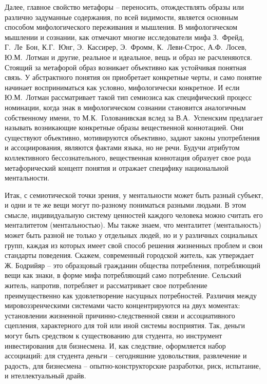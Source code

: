 Далее, главное свойство метафоры -- переносить, отождествлять образы или различно
задуманные содержания, по всей видимости, является основным способом мифологического
переживания и мышления. В мифологическом мышлении и сознании, как отмечают многие
исследователи мифа З.~Фрейд, Г.~Ле~Бон, К.Г.~Юнг, Э.~Кассирер, Э.~Фромм, К.~Леви-Строс,
А.Ф.~Лосев, Ю.М.~Лотман и другие, реальное и идеальное, вещь и образ не расчленяются.
Стоящий за метафорой образ возникает объективно как устойчивая понятная связь. У абстрактного
понятия он приобретает конкретные черты, и само понятие начинает восприниматься как условно,
мифологически конкретное. И если Ю.М.~Лотман рассматривает такой тип семиозиса как специфический
процесс номинации, когда знак в мифологическом сознании становится аналогичным собственному имени\autocite{name_culture},
то М.К.~Голованивская вслед за В.А.~Успенским предлагает называть возникающие конкретные образы
вещественной коннотацией\autocite{uspensky}. Они существуют объективно, мотивируются объективно,
задают законы употребления и ассоциирования, являются фактами языка, но не речи. Будучи атрибутом
коллективного бессознательного, вещественная коннотация образует свое рода метафорический концепт
понятия и отражает специфику национальной ментальности.

Итак, с семиотической точки зрения, у ментальности может быть разный субъект,
и одни и те же вещи могут по-разному пониматься разными людьми. В этом смысле, индивидуальную
систему ценностей каждого человека можно считать его менталитетом (ментальностью). Мы также знаем,
что менталитет (ментальность) может быть разной не только у отдельных людей, но и у различных
социальных групп, каждая из которых имеет свой способ решения жизненных проблем и свои стандарты поведения.
Скажем, современный городской житель, как утверждает Ж. Бодрийяр -- это образцовый гражданин общества
потребления, потребляющий вещи как знаки, в форме мифа потребляющий само потребление\autocite[][19--72]{bodriyar_society}.
Сельский житель, напротив, потребляет и рассматривает свое потребление преимущественно как удовлетворение
насущных потребностей. Различия между мировоззренческими системами часто концентрируются на двух моментах:
установлении жизненной причинно-следственной связи и ассоциативного сцепления, характерного для той или
иной системы восприятия. Так, деньги могут быть средством к существованию для студента, но инструмент инвестирования
для бизнесмена. И, как следствие, оформляется набор ассоциаций: для студента деньги -- сегодняшние удовольствия,
развлечение и радость, для бизнесмена -- опытно-конструкторские разработки, риск, испытание, и
нтеллектуальный драйв.

